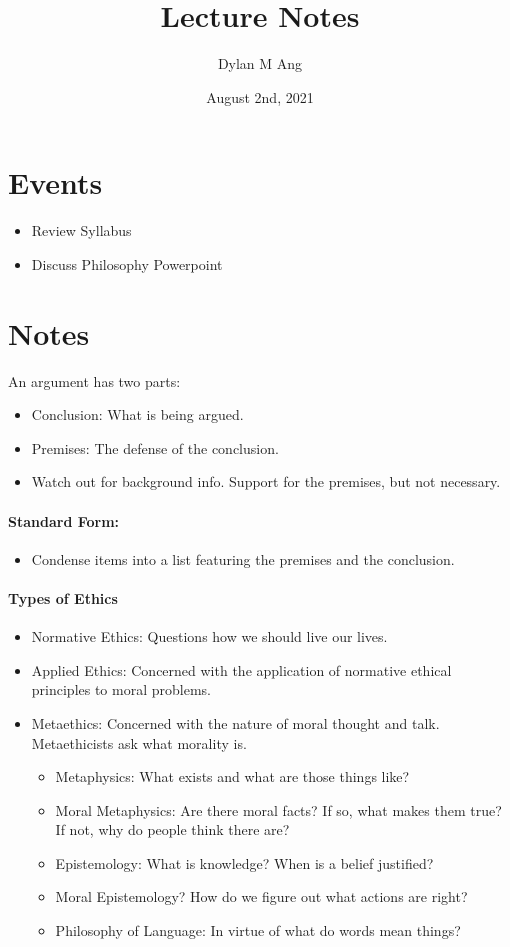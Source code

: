 \documentclass[12pt]{article}
\title{Lecture Notes}
\author{Dylan M Ang}
\date{August 2nd, 2021}
\begin{document}
\maketitle

\tableofcontents

\section{Events}
\begin{itemize}
    \item Review Syllabus
    \item Discuss Philosophy Powerpoint
\end{itemize}

\section{Notes}

An argument has two parts:
\begin{itemize}
    \item Conclusion: What is being argued.
    \item Premises: The defense of the conclusion.
    \item Watch out for background info. Support for the premises, but not necessary.
\end{itemize}

\paragraph{Standard Form:}
\begin{itemize}
    \item Condense items into a list featuring the premises and the conclusion.
\end{itemize}

\paragraph{Types of Ethics}
\begin{itemize}
    \item Normative Ethics: Questions how we should live our lives.
    \item Applied Ethics: Concerned with the application of normative ethical principles to moral problems.
    \item Metaethics: Concerned with the nature of moral thought and talk. Metaethicists ask what morality is.
    \begin{itemize}
        \item Metaphysics: What exists and what are those things like? 
        \item Moral Metaphysics: Are there moral facts? If so, what makes them true? If not, why do people think there are?
        \item Epistemology: What is knowledge? When is a belief justified?
        \item Moral Epistemology? How do we figure out what actions are right?
        \item Philosophy of Language: In virtue of what do words mean things?
    \end{itemize}
\end{itemize}
\end{document}
